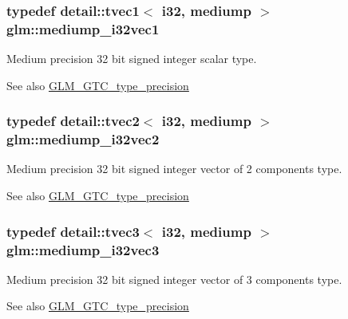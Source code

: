 \subsubsection[{\texorpdfstring{mediump\+\_\+i32vec1}{mediump_i32vec1}}]{\setlength{\rightskip}{0pt plus 5cm}typedef detail\+::tvec1$<$ i32, mediump $>$ {\bf glm\+::mediump\+\_\+i32vec1}}\hypertarget{group__gtc__type__precision_ga44c6a3b78e635d91e35e1c41ab6b0ba1}{}\label{group__gtc__type__precision_ga44c6a3b78e635d91e35e1c41ab6b0ba1}
Medium precision 32 bit signed integer scalar type. \begin{DoxySeeAlso}{See also}
\hyperlink{group__gtc__type__precision}{G\+L\+M\+\_\+\+G\+T\+C\+\_\+type\+\_\+precision} 
\end{DoxySeeAlso}
\subsubsection[{\texorpdfstring{mediump\+\_\+i32vec2}{mediump_i32vec2}}]{\setlength{\rightskip}{0pt plus 5cm}typedef detail\+::tvec2$<$ i32, mediump $>$ {\bf glm\+::mediump\+\_\+i32vec2}}\hypertarget{group__gtc__type__precision_gaef7b37956ce9e1cc4faecf21b7fdae8b}{}\label{group__gtc__type__precision_gaef7b37956ce9e1cc4faecf21b7fdae8b}
Medium precision 32 bit signed integer vector of 2 components type. \begin{DoxySeeAlso}{See also}
\hyperlink{group__gtc__type__precision}{G\+L\+M\+\_\+\+G\+T\+C\+\_\+type\+\_\+precision} 
\end{DoxySeeAlso}
\subsubsection[{\texorpdfstring{mediump\+\_\+i32vec3}{mediump_i32vec3}}]{\setlength{\rightskip}{0pt plus 5cm}typedef detail\+::tvec3$<$ i32, mediump $>$ {\bf glm\+::mediump\+\_\+i32vec3}}\hypertarget{group__gtc__type__precision_ga768e62b66086bd85a438341eedfad651}{}\label{group__gtc__type__precision_ga768e62b66086bd85a438341eedfad651}
Medium precision 32 bit signed integer vector of 3 components type. \begin{DoxySeeAlso}{See also}
\hyperlink{group__gtc__type__precision}{G\+L\+M\+\_\+\+G\+T\+C\+\_\+type\+\_\+precision} 
\end{DoxySeeAlso}
